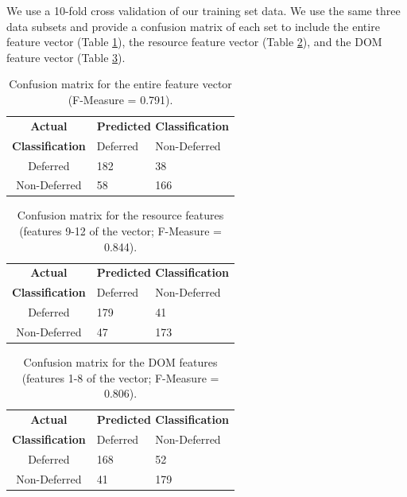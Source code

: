 \documentclass{sig-alternate}
\begin{document}
We use a 10-fold cross validation of our training set data. We use the same three data subsets and provide a confusion matrix of each set to include the entire feature vector (Table \ref{cmAll}), the resource feature vector (Table \ref{cmResource}), and the DOM feature vector (Table \ref{cmDOM}).

\begin{table}
\centering\begin{tabular}{cll}
\textbf{Actual} & \multicolumn{2}{c}{ \textbf{Predicted Classification}}                           \\
\textbf{Classification}   &          Deferred       &           Non-Deferred             \\ \cline{2-3} 
       Deferred           & \multicolumn{1}{|l}{182} & \multicolumn{1}{|l|}{38} \\ \cline{2-3} 
       Non-Deferred       & \multicolumn{1}{|l}{58} & \multicolumn{1}{|l|}{166} \\ \cline{2-3} 
\end{tabular}
 \caption{Confusion matrix for the entire feature vector (F-Measure = 0.791).}
  \label{cmAll}
\end{table}

\begin{table}
\centering\begin{tabular}{cll}
\textbf{Actual} & \multicolumn{2}{c}{ \textbf{Predicted Classification}}                           \\
\textbf{Classification}   &          Deferred       &           Non-Deferred             \\ \cline{2-3} 
       Deferred           & \multicolumn{1}{|l}{179} & \multicolumn{1}{|l|}{41} \\ \cline{2-3} 
       Non-Deferred       & \multicolumn{1}{|l}{47} & \multicolumn{1}{|l|}{173} \\ \cline{2-3} 
\end{tabular}
 \caption{Confusion matrix for the resource features (features 9-12 of the vector; F-Measure = 0.844).}
  \label{cmResource}
\end{table}

\begin{table}
\centering\begin{tabular}{cll}
\textbf{Actual} & \multicolumn{2}{c}{ \textbf{Predicted Classification}}                           \\
\textbf{Classification}   &          Deferred       &           Non-Deferred             \\ \cline{2-3} 
       Deferred           & \multicolumn{1}{|l}{168} & \multicolumn{1}{|l|}{52} \\ \cline{2-3} 
       Non-Deferred       & \multicolumn{1}{|l}{41} & \multicolumn{1}{|l|}{179} \\ \cline{2-3} 
\end{tabular}
 \caption{Confusion matrix for the DOM features (features 1-8 of the vector; F-Measure = 0.806).}
  \label{cmDOM}
\end{table}
\end{document}
